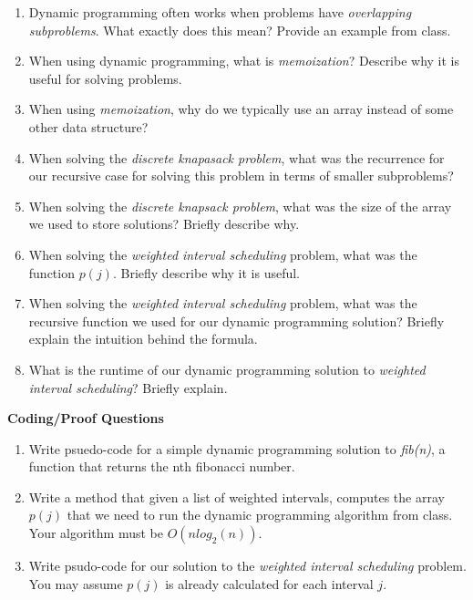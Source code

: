 \documentclass[10pt]{article}
\begin{document}
\begin{enumerate}
	\setlength\itemsep{0.25em}
	\item Dynamic programming often works when problems have \emph{overlapping subproblems}. What exactly does this mean? Provide an example from class.
	\item When using dynamic programming, what is \emph{memoization}? Describe why it is useful for solving problems.
	\item When using \emph{memoization}, why do we typically use an array instead of some other data structure?
	\item When solving the \emph{discrete knapasack problem}, what was the recurrence for our recursive case for solving this problem in terms of smaller subproblems?
	\item When solving the \emph{discrete knapsack problem}, what was the size of the array we used to store solutions? Briefly describe why.
	\item When solving the \emph{weighted interval scheduling} problem, what was the function $p(j)$. Briefly describe why it is useful.
	\item When solving the \emph{weighted interval scheduling} problem, what was the recursive function we used for our dynamic programming solution? Briefly explain the intuition behind the formula.
	\item What is the runtime of our dynamic programming solution to \emph{weighted interval scheduling}? Briefly explain.
\end{enumerate}

\vspace{0.5in}

\textbf{Coding/Proof Questions}
\begin{enumerate}
	\setlength\itemsep{0.25em}
	\item Write psuedo-code for a simple dynamic programming solution to \emph{fib(n)}, a function that returns the nth fibonacci number.
	\item Write a method that given a list of weighted intervals, computes the array $p(j)$ that we need to run the dynamic programming algorithm from class. Your algorithm must be $O(nlog_2(n))$.
	\item Write psudo-code for our solution to the \emph{weighted interval scheduling} problem. You may assume $p(j)$ is already calculated for each interval $j$.
\end{enumerate}
\end{document}
